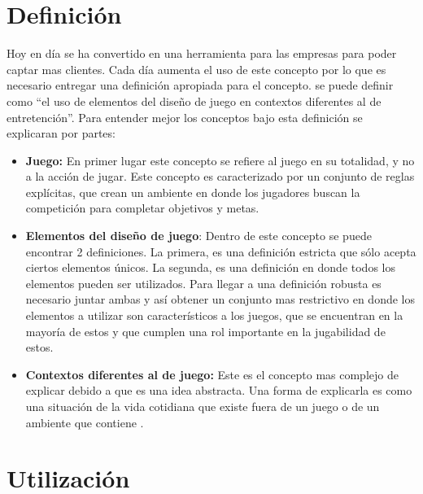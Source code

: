 \section{Definición}

Hoy en día {\GAM} se ha convertido en una herramienta para las empresas
para poder captar mas clientes.
Cada día aumenta el uso de este concepto por lo que es necesario entregar una
definición apropiada para el concepto.
{\GAM} se puede definir como ``el uso de elementos del diseño de juego en contextos
diferentes al de entretención''.
Para entender mejor los conceptos bajo esta definición se explicaran por partes:

\begin{itemize}
    \item {\bf Juego:}
        En primer lugar este concepto se refiere al juego en su totalidad,
        y no a la acción de jugar.
        Este concepto es caracterizado por un conjunto de reglas explícitas,
        que crean un ambiente en donde los jugadores buscan la competición para
        completar objetivos y metas.

    \item {\bf Elementos del diseño de juego}:
        Dentro de este concepto se puede encontrar 2 definiciones.
        La primera, es una definición estricta que sólo acepta ciertos elementos
        únicos.
        La segunda, es una definición en donde todos los elementos pueden ser
        utilizados.
        Para llegar a una definición robusta es necesario juntar ambas y así
        obtener un conjunto mas restrictivo en donde los elementos a utilizar
        son característicos a los juegos, que se encuentran en la mayoría de estos
        y que cumplen una rol importante en la jugabilidad de estos.

    \item {\bf Contextos diferentes al de juego:}
        Este es el concepto mas complejo de explicar debido a que es una idea
        abstracta.
        Una forma de explicarla es como una situación de la vida cotidiana
        que existe fuera de un juego o de un ambiente que contiene {\GAM}.

\end{itemize}

\section{Utilización}


